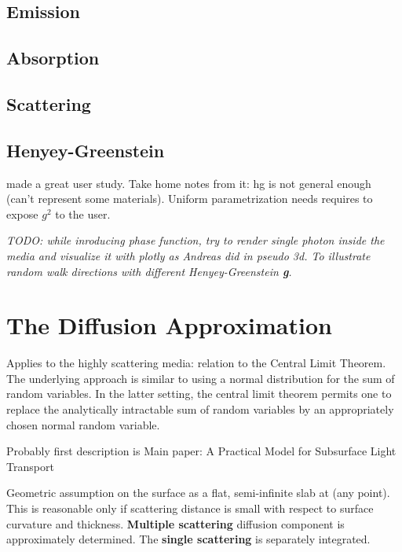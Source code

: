 \subsection{Emission}
\subsection{Absorption}
\subsection{Scattering}

\subsection{Henyey-Greenstein}
\label{section:phasefunction}
\cite{Gkioulekas:2013:IVR:2508363.2508377} made a great user study.
Take home notes from it: \gls{hg} is not general enough (can't represent some
materials). Uniform parametrization needs requires to expose $g^2$ to the user.

\emph{TODO: while inroducing phase function, try to render single photon inside
the media and visualize it with plotly as Andreas did in pseudo 3d. To illustrate
random walk directions with different Henyey-Greenstein \textbf{g}.}

\section{The Diffusion Approximation}
Applies to the highly scattering media: relation to the Central Limit Theorem.
The underlying approach is similar to using a normal distribution for the sum of
random variables.
In the latter setting, the central limit theorem permits one to replace the analytically intractable sum of random variables by
an appropriately chosen normal random variable.

Probably first description is \cite{Stam1995}
Main paper: A Practical Model for Subsurface Light Transport \cite{Jensen:2001:PMS:383259.383319}

Geometric assumption on the surface as a flat, semi-infinite slab at (any
point). This is reasonable only if scattering distance is small with respect to
surface curvature and thickness. \textbf{Multiple scattering} diffusion
component is approximately determined. The \textbf{single scattering} is
separately integrated.
